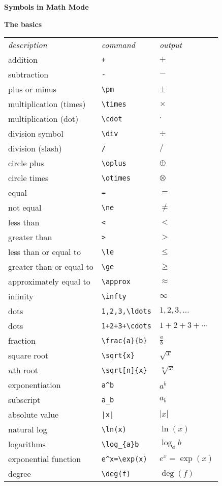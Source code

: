 \documentclass[10pt,landscape]{article}
\newcommand{\ColorSection}[1]{\par\vspace{1.5ex}\noindent\textcolor{sectioncolor}{\Large\bfseries #1}\par\vspace{0.75ex}}
\newcommand{\ColorSubsection}[1]{\par\vspace{1ex}\noindent\textcolor{subsectioncolor}{\normalsize\bfseries #1}\par\vspace{0.5ex}}
\begin{document}
\begin{multicols}{3}
\ColorSection{Symbols in Math Mode}

\ColorSubsection{The basics}
\begin{tabular}{lll}
\emph{description} & \emph{command} & \emph{output}\\
addition & \verb!+! & \(+\)\\
subtraction & \verb!-! & \(-\)\\
plus or minus & \verb!\pm! & \(\pm\)\\
multiplication (times) & \verb!\times! & \(\times\)\\
multiplication (dot) & \verb!\cdot! & \(\cdot\)\\
division symbol & \verb!\div! & \(\div\)\\
division (slash) & \verb!/! & \(/\)\\
circle plus & \verb!\oplus! & \(\oplus\)\\
circle times & \verb!\otimes! & \(\otimes\)\\
equal & \verb!=! & \(=\)\\
not equal & \verb!\ne! & \(\ne\)\\
less than & \verb!<! & \(<\)\\
greater than & \verb!>! & \(>\)\\
less than or equal to & \verb!\le! & \(\le\)\\
greater than or equal to & \verb!\ge! & \(\ge\)\\
approximately equal to & \verb!\approx! & \(\approx\)\\
infinity & \verb!\infty! & \(\infty\)\\
dots & \verb!1,2,3,\ldots! & \(1,2,3,\ldots\)\\
dots & \verb!1+2+3+\cdots! & \(1+2+3+\cdots\)\\
fraction & \verb!\frac{a}{b}! & \(\frac{a}{b}\)\\
square root & \verb!\sqrt{x}! & \(\sqrt{x}\)\\
\(n\)th root & \verb!\sqrt[n]{x}! & \(\sqrt[n]{x}\)\\
exponentiation & \verb!a^b! & \(a^{b}\)\\
subscript & \verb!a_b! & \(a_{b}\)\\
absolute value & \verb!|x|! & \(|x|\)\\
natural log  & \verb!\ln(x)! & \(\ln(x)\)\\
logarithms & \verb!\log_{a}b! & \(\log_{a}b\)\\
exponential function & \verb!e^x=\exp(x)! & \(e^{x}=\exp(x)\)\\
degree & \verb!\deg(f)! & \(\deg(f)\)\\
\end{tabular}


\end{multicols}
\end{document}
